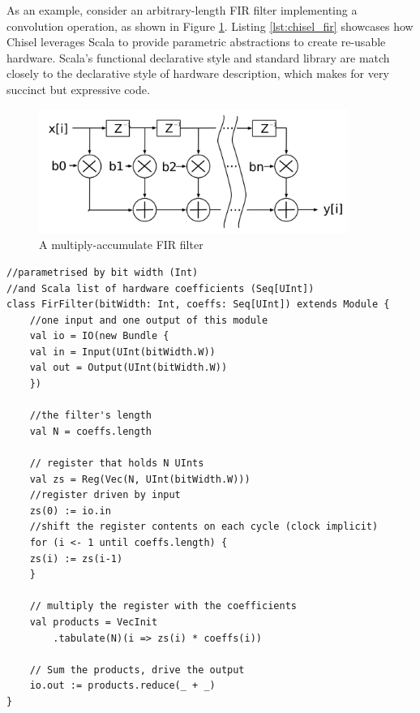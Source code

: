 As an example, consider an arbitrary-length FIR filter implementing a convolution operation, as shown in Figure \ref{fig:fir}. Listing \ref{lst:chisel_fir} showcases how Chisel leverages Scala to provide parametric abstractions to create re-usable hardware. Scala's functional declarative style and standard library are match closely to the declarative style of hardware description, which makes for very succinct but expressive code.

\begin{figure}[H]
    \centering
    \includegraphics[width=0.9\textwidth]{../img/fir_filter.png}
    \caption{A multiply-accumulate FIR filter \cite{chisel_site}}
    \label{fig:fir}
\end{figure}


\begin{listing}[h!]
    \vspace{0.5cm}
    \begin{verbatim}
//parametrised by bit width (Int)
//and Scala list of hardware coefficients (Seq[UInt])
class FirFilter(bitWidth: Int, coeffs: Seq[UInt]) extends Module {
    //one input and one output of this module
    val io = IO(new Bundle {
    val in = Input(UInt(bitWidth.W))
    val out = Output(UInt(bitWidth.W))
    })
    
    //the filter's length
    val N = coeffs.length

    // register that holds N UInts
    val zs = Reg(Vec(N, UInt(bitWidth.W)))
    //register driven by input
    zs(0) := io.in 
    //shift the register contents on each cycle (clock implicit)
    for (i <- 1 until coeffs.length) {
    zs(i) := zs(i-1)
    }

    // multiply the register with the coefficients
    val products = VecInit
        .tabulate(N)(i => zs(i) * coeffs(i))

    // Sum the products, drive the output
    io.out := products.reduce(_ + _)
}
    \end{verbatim}
    \caption{Code implementing the circuit shown in Figure \ref{fig:fir} \cite{chisel_site}}
    \label{lst:chisel_fir}
\end{listing}

